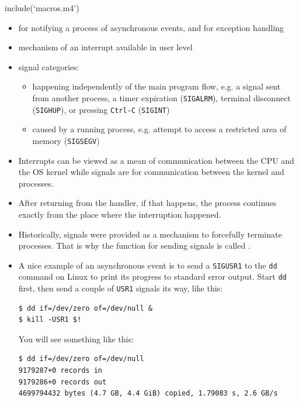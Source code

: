 include(`macros.m4')


\begin{slide}
\end{slide}


\begin{slide}
\begin{itemize}
\item for notifying a process of asynchronous events, and for exception handling
\item mechanism of an interrupt available in user level
\item signal categories:
    \begin{itemize}
    \item {} happening independently of the main program
    flow, e.g. a signal sent from another process, a timer expiration
    (\texttt{SIGALRM}), terminal disconnect (\texttt{SIGHUP}), or pressing
    \texttt{Ctrl-C} (\texttt{SIGINT})
    \item {} caused by a running process, e.g.
    attempt to access a restricted area of memory (\texttt{SIGSEGV})
    \end{itemize}
\end{itemize}
\end{slide}


\begin{itemize}
\item Interrupts can be viewed as a mean of communication between the CPU and
the OS kernel while signals are for communication between the kernel and
processes.
\item After returning from the handler, if that happens, the process continues
exactly from the place where the interruption happened.
\item Historically, signals were provided as a mechanism to forcefully terminate
processes.  That is why the function for sending signals is called
.
\item A nice example of an asynchronous event is to send a \texttt{SIGUSR1} to
the \texttt{dd} command on Linux to print its progress to standard error output.
Start \texttt{dd} first, then send a couple of \texttt{USR1} signals its way,
like this:

\begin{verbatim}
$ dd if=/dev/zero of=/dev/null &
$ kill -USR1 $!
\end{verbatim}

You will see something like this:

\begin{verbatim}
$ dd if=/dev/zero of=/dev/null
9179287+0 records in
9179286+0 records out
4699794432 bytes (4.7 GB, 4.4 GiB) copied, 1.79083 s, 2.6 GB/s
\end{verbatim}
\end{itemize}

